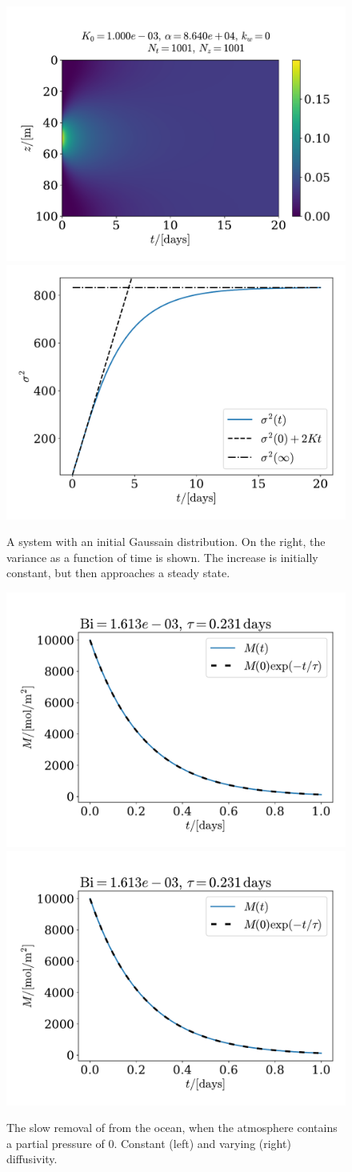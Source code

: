 \documentclass{article}
\begin{document}
    \begin{figure}
        \centering
        \includegraphics[width=.49\textwidth]{../plots/test3}
        \includegraphics[width=.45\textwidth]{../plots/test3_var}
        \caption{A system with an initial Gaussain distribution. On the right, the variance as a function of time is shown. The increase is initially constant, but then approaches a steady state.}
        \label{var}
    \end{figure}

    \begin{figure}
        \centering
        \includegraphics[width=.49\textwidth]{../plots/test4_decay}
        \includegraphics[width=.49\textwidth]{../plots/test4_varK_decay}
        \caption{The slow removal of  from the ocean, when the atmosphere contains a partial pressure of 0. Constant (left) and varying (right) diffusivity.}
        \label{decay}
    \end{figure}
\end{document}
